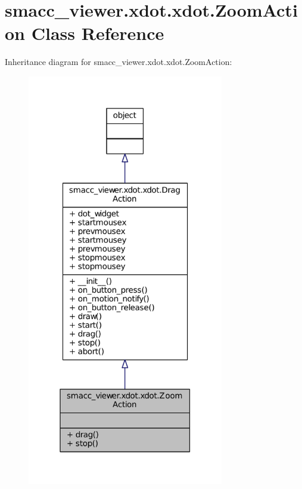 \hypertarget{classsmacc__viewer_1_1xdot_1_1xdot_1_1ZoomAction}{}\section{smacc\+\_\+viewer.\+xdot.\+xdot.\+Zoom\+Action Class Reference}
\label{classsmacc__viewer_1_1xdot_1_1xdot_1_1ZoomAction}


Inheritance diagram for smacc\+\_\+viewer.\+xdot.\+xdot.\+Zoom\+Action\+:
\nopagebreak
\begin{figure}[H]
\begin{center}
\leavevmode
\includegraphics[width=243pt]{classsmacc__viewer_1_1xdot_1_1xdot_1_1ZoomAction__inherit__graph}
\end{center}
\end{figure}


